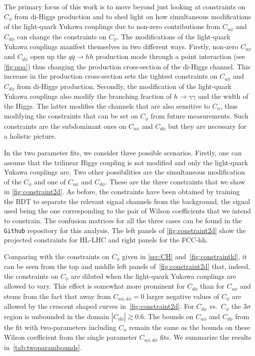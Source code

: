 The primary focus of this work is to move beyond just looking at constraints on $C_\phi$ from di-Higgs production and to shed light on how simultaneous modifications of the light-quark Yukawa couplings due to non-zero contributions from $C_{u\phi}$ and $C_{d\phi}$ can change the constraints on $C_\phi$. The modifications of the light-quark Yukawa couplings manifest themselves in two different ways. Firstly, non-zero $C_{u\phi}$ and $C_{d\phi}$ open up the $q\bar q \to hh$ production mode through a point interaction (see \autoref{fig:qqa}) thus changing the production cross-section of the di-Higgs channel. This increase in the production cross-section sets the tightest constraints on $C_{u\phi}$ and $C_{d\phi}$ from di-Higgs production. Secondly, the modification of the light-quark Yukawa couplings also modify the branching fraction of $h\to\gamma\gamma$ and the width of the Higgs. The latter modifies the channels that are also sensitive to $C_\phi$, thus modifying the constraints that can be set on $C_\phi$ from future measurements. Such constraints are the subdominant ones on $C_{u\phi}$ and $C_{d\phi}$ but they are necessary for a holistic picture.

In the two parameter fits, we consider three possible scenarios. Firstly, one can assume that the trilinear Higgs coupling is not modified and only the light-quark Yukawa couplings are. Two other possibilities are the simultaneous modification of the $C_\phi$ and one of $C_{u\phi}$ and $C_{d\phi}$. These are the three constraints that we show in \autoref{fig:constraint2d}. 
As before, the constraints have been obtained by training the BDT to separate the relevant signal channels from the background, the signal used being the one corresponding to the pair of Wilson coefficients that we intend to constrain. The confusion matrices for all the three cases can be found in the \texttt{Github} repository for this analysis. The left panels of \autoref{fig:constraint2d} show the projected constraints for HL-LHC and right panels for the FCC-hh.

Comparing with the constraints on $C_\phi$ given in \autoref{sec:CH} and~\autoref{fig:constraintkl}, it can be seen from the top and middle left panels of~\autoref{fig:constraint2d} that, indeed, the constraints on $C_\phi$ are diluted when the light-quark Yukawa couplings are allowed to vary. This effect is somewhat more prominent for $C_{d\phi}$ than for $C_{u\phi}$ and stems from the fact that away from $C_{u\phi,d\phi} = 0$ larger negative values of $C_\phi$ are allowed by the crescent shaped curves in~\autoref{fig:constraint2d}. For $C_{d\phi}$ vs.~$C_\phi$ the 3$\sigma$ region is unbounded in the domain $|C_{d\phi}| \gtrsim 0.6$. The bounds on $C_{u\phi}$ and $C_{d\phi}$ from the fit with two-parameters including $C_\phi$ remain the same as the bounds on these Wilson coefficient from the single parameter $C_{u\phi,d\phi}$ fits. We summarize the results in~\autoref{tab:twoparambounds}. 

